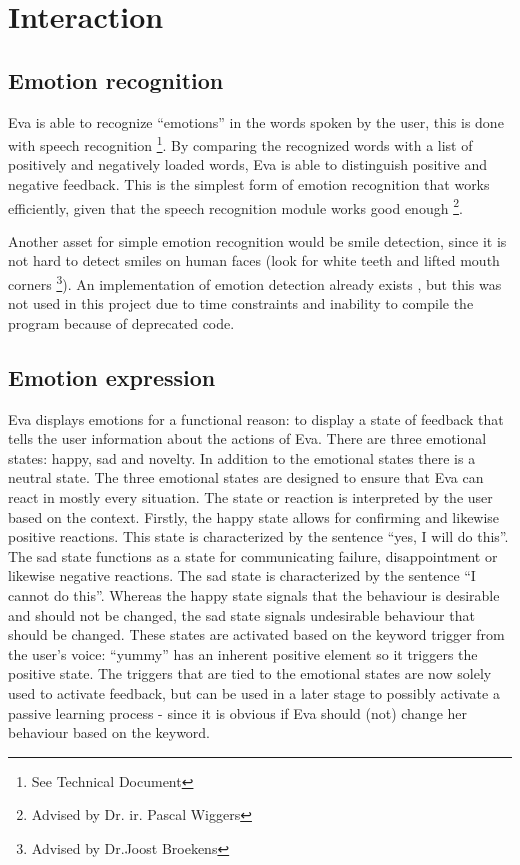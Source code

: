 \documentclass[project_eva.tex]{subfiles}
\begin{document}
\section*{Interaction}

\subsection*{Emotion recognition}
Eva is able to recognize ``emotions'' in the words spoken by the user, this is done with speech recognition \footnote{See 
Technical Document}. By comparing the recognized words with a list of positively and 
negatively loaded words, Eva is able to distinguish positive and negative feedback. This is the simplest form of emotion 
recognition that works efficiently, given that the speech recognition module works good enough \footnote{Advised by Dr. ir. 
Pascal Wiggers}. 

Another asset for simple emotion recognition would be smile detection, since it is not hard to detect smiles on human faces 
(look for white teeth and lifted mouth corners \footnote{Advised by Dr.Joost Broekens}). An implementation of emotion 
detection already exists \cite{autosmiley}, but this was not used in this project due to time 
constraints and inability to compile the program because of deprecated code.
 
\subsection*{Emotion expression}
\label{sec:Emotion expression}
Eva displays emotions for a functional reason: to display a state of feedback that tells the user information about the 
actions of Eva. There are three emotional states: happy, sad and novelty. In  addition to the emotional states there is a 
neutral state. The three emotional states are designed to ensure that Eva can react in mostly every situation. The state or 
reaction is interpreted by the user based on the context. Firstly, the happy  state allows for confirming and likewise 
positive reactions. This state is characterized by the sentence ``yes, I will do this''. The sad state functions as a state 
for communicating failure, disappointment or likewise negative reactions. The sad state is characterized by the sentence 
``I cannot do this''.  Whereas the happy state signals that the behaviour is desirable and should not be changed, the sad 
state signals undesirable behaviour that should be changed. These states are activated based on the keyword trigger from 
the user’s voice: ``yummy'' has an inherent positive element so it triggers the positive state. The triggers that are tied 
to the emotional states are now solely used to activate feedback, but can be used in a later stage to possibly activate a 
passive learning process - since it is obvious if Eva should (not) change her behaviour based on the keyword.
\end{document}

